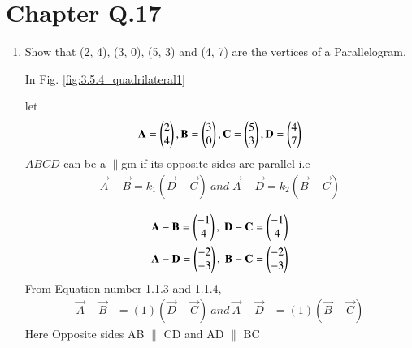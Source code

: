 \documentclass[journal,12pt,twocolumn]{IEEEtran}
\renewcommand\thesection{\arabic{section}}
\begin{document}
\renewcommand{\thefigure}{\theenumi}
\renewcommand{\thetable}{\theenumi}




\section{ Chapter   Q.17 }
\renewcommand{\theequation}{\theenumi}
\begin{enumerate}[label=\thesection.\arabic*.,ref=\thesection.\theenumi]


\item Show that (2, 4), (3, 0), (5, 3) and (4, 7) are the vertices of a Parallelogram.

\solution
\newline In Fig. 	\ref{fig:3.5.4_quadrilateral1}

let \begin{align}
    \mathbf{A} = \begin{pmatrix}2\\4\end{pmatrix}, \mathbf{B} = \begin{pmatrix}3\\0\end{pmatrix}, \mathbf{C} = \begin{pmatrix}5\\3\end{pmatrix}, \mathbf{D} = \begin{pmatrix}4\\7\end{pmatrix}
\end{align}
$ABCD$ can be a $\parallel$gm if its opposite sides are parallel i.e
\begin{align}
    \vec{A} - \vec{B} = k_1 ( \vec{D} - \vec{C} )\:and\;
    \vec{A} - \vec{D} = k_2 ( \vec{B} - \vec{C} ) 
\end{align}

\begin{align}
\label{eq:constr_vectors_quad1_ABCD}
\mathbf{A} - \mathbf{B} = \begin{pmatrix}-1\\4\end{pmatrix},\;
\mathbf{D} - \mathbf{C} = \begin{pmatrix}-1\\4\end{pmatrix}
\\
\mathbf {A} - \mathbf {D} = \begin{pmatrix}-2\\-3\end{pmatrix},\;
\mathbf {B} - \mathbf {C} =\begin{pmatrix}-2\\-3\end{pmatrix}
\label{eq:constr_vectors_quad1_RSQP}
\end{align}
From Equation number 1.1.3 and 1.1.4,
\begin{align}
    \vec{A} - \vec{B} &= (1) ( \vec{D} - \vec{C} ) \: and \:
    \vec{A} - \vec{D}& = (1) ( \vec{B} - \vec{C} ) 
\end{align}
Here Opposite sides AB $\parallel$ CD and AD $\parallel$ BC 


\end{enumerate}
\end{document}
